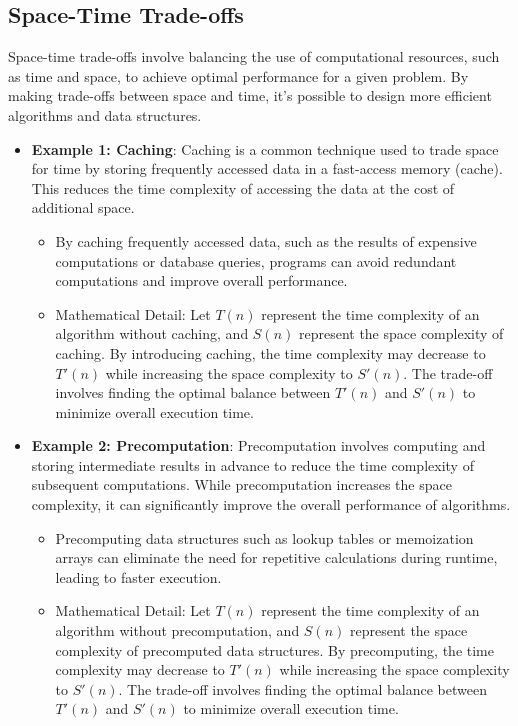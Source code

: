 \documentclass[12pt]{book} %
\begin{document}
\subsection{Space-Time Trade-offs}
Space-time trade-offs involve balancing the use of computational resources, such as time and space, to achieve optimal performance for a given problem. By making trade-offs between space and time, it's possible to design more efficient algorithms and data structures.

\begin{itemize}
    \item \textbf{Example 1: Caching}: Caching is a common technique used to trade space for time by storing frequently accessed data in a fast-access memory (cache). This reduces the time complexity of accessing the data at the cost of additional space.
    \begin{itemize}
        \item By caching frequently accessed data, such as the results of expensive computations or database queries, programs can avoid redundant computations and improve overall performance.
        \item Mathematical Detail: Let \(T(n)\) represent the time complexity of an algorithm without caching, and \(S(n)\) represent the space complexity of caching. By introducing caching, the time complexity may decrease to \(T'(n)\) while increasing the space complexity to \(S'(n)\). The trade-off involves finding the optimal balance between \(T'(n)\) and \(S'(n)\) to minimize overall execution time.
    \end{itemize}
    \item \textbf{Example 2: Precomputation}: Precomputation involves computing and storing intermediate results in advance to reduce the time complexity of subsequent computations. While precomputation increases the space complexity, it can significantly improve the overall performance of algorithms.
    \begin{itemize}
        \item Precomputing data structures such as lookup tables or memoization arrays can eliminate the need for repetitive calculations during runtime, leading to faster execution.
        \item Mathematical Detail: Let \(T(n)\) represent the time complexity of an algorithm without precomputation, and \(S(n)\) represent the space complexity of precomputed data structures. By precomputing, the time complexity may decrease to \(T'(n)\) while increasing the space complexity to \(S'(n)\). The trade-off involves finding the optimal balance between \(T'(n)\) and \(S'(n)\) to minimize overall execution time.
    \end{itemize}
\end{itemize}
\end{document}
